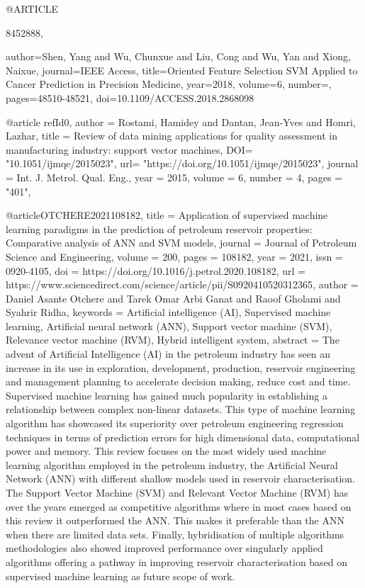 \begin{thebibliography}{widestlabel}
@ARTICLE{8452888,
	
	author={Shen, Yang and Wu, Chunxue and Liu, Cong and Wu, Yan and Xiong, Naixue},
	journal={IEEE Access}, 
	title={Oriented Feature Selection SVM Applied to Cancer Prediction in Precision Medicine}, 
	year={2018},
	volume={6},
	number={},
	pages={48510-48521},
	doi={10.1109/ACCESS.2018.2868098}
}

@article{ refId0,
	author = {{Rostami, Hamidey} and {Dantan, Jean-Yves} and {Homri, Lazhar}},
	title = {Review of data mining applications for quality assessment   in manufacturing industry: support vector machines},
	DOI= "10.1051/ijmqe/2015023",
	url= "https://doi.org/10.1051/ijmqe/2015023",
	journal = {Int. J. Metrol. Qual.
	Eng.},
	year = 2015,
	volume = 6,
	number = 4,
	pages = "401",
}

@article{OTCHERE2021108182,
	title = {Application of supervised machine learning paradigms in the prediction of petroleum reservoir properties: Comparative analysis of ANN and SVM models},
	journal = {Journal of Petroleum Science and Engineering},
	volume = {200},
	pages = {108182},
	year = {2021},
	issn = {0920-4105},
	doi = {https://doi.org/10.1016/j.petrol.2020.108182},
	url = {https://www.sciencedirect.com/science/article/pii/S0920410520312365},
	author = {Daniel Asante Otchere and Tarek Omar {Arbi Ganat} and Raoof Gholami and Syahrir Ridha},
	keywords = {Artificial intelligence (AI), Supervised machine learning, Artificial neural network (ANN), Support vector machine (SVM), Relevance vector machine (RVM), Hybrid intelligent system},
	abstract = {The advent of Artificial Intelligence (AI) in the petroleum industry has seen an increase in its use in exploration, development, production, reservoir engineering and management planning to accelerate decision making, reduce cost and time. Supervised machine learning has gained much popularity in establishing a relationship between complex non-linear datasets. This type of machine learning algorithm has showcased its superiority over petroleum engineering regression techniques in terms of prediction errors for high dimensional data, computational power and memory. This review focuses on the most widely used machine learning algorithm employed in the petroleum industry, the Artificial Neural Network (ANN) with different shallow models used in reservoir characterisation. The Support Vector Machine (SVM) and Relevant Vector Machine (RVM) has over the years emerged as competitive algorithms where in most cases based on this review it outperformed the ANN. This makes it preferable than the ANN when there are limited data sets. Finally, hybridisation of multiple algorithms methodologies also showed improved performance over singularly applied algorithms offering a pathway in improving reservoir characterisation based on supervised machine learning as future scope of work.}
}


\end{thebibliography}
